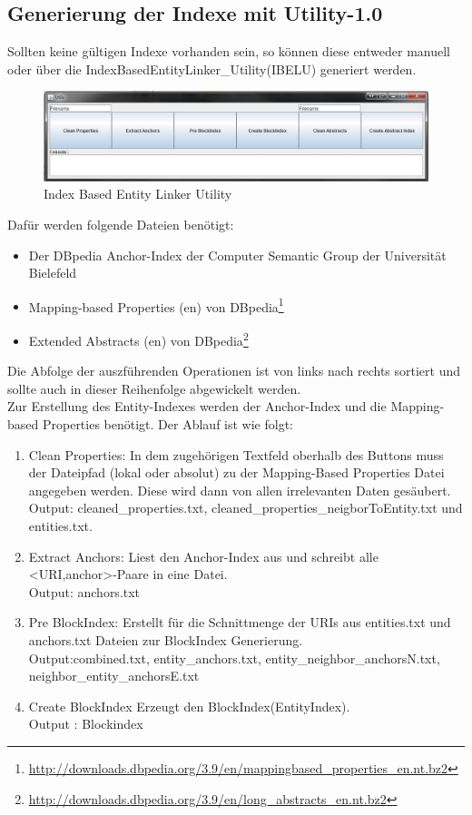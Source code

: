 \documentclass[11pt, a4paper, oneside]{Thesis} %
\begin{document}
\subsection{Generierung der Indexe mit Utility-1.0}
Sollten keine gültigen Indexe vorhanden sein, so k\"onnen diese entweder manuell oder \"uber die IndexBasedEntityLinker\_Utility(IBELU) generiert werden.
\begin{figure}[ht]
\centering
\includegraphics[scale=0.52]{util.jpg}
\caption[Index Based Entity Linker Utility]{Index Based Entity Linker Utility}
\end{figure}
\clearpage
Daf\"ur werden folgende Dateien ben\"otigt:
\begin{itemize}
\item Der DBpedia Anchor-Index der Computer Semantic Group der Universit\"at Bielefeld
\item Mapping-based Properties (en) von DBpedia\footnote{\url{http://downloads.dbpedia.org/3.9/en/mappingbased\_properties\_en.nt.bz2}}
\item Extended Abstracts (en) von DBpedia\footnote{\url{http://downloads.dbpedia.org/3.9/en/long\_abstracts\_en.nt.bz2}}
\end{itemize}
Die Abfolge der auszf\"uhrenden Operationen ist von links nach rechts sortiert und sollte auch in dieser Reihenfolge abgewickelt werden.\\
Zur Erstellung des Entity-Indexes werden der Anchor-Index und die Mapping-based Properties ben\"otigt. Der Ablauf ist wie folgt:
\begin{enumerate}
\item Clean Properties: In dem zugeh\"origen Textfeld oberhalb des Buttons muss der Dateipfad (lokal oder absolut) zu der Mapping-Based Properties Datei angegeben werden. Diese wird dann von allen irrelevanten Daten ges\"aubert.\\
Output: cleaned\_properties.txt, cleaned\_properties\_neigborToEntity.txt und \\entities.txt.
\item Extract Anchors: Liest den Anchor-Index aus und schreibt alle \\ \textless URI,anchor\textgreater-Paare in eine Datei.\\
Output: anchors.txt
\item Pre BlockIndex: Erstellt f\"ur die Schnittmenge der URIs aus entities.txt und anchors.txt Dateien zur BlockIndex Generierung.\\
Output:combined.txt, entity\_anchors.txt, entity\_neighbor\_anchorsN.txt,
\\neighbor\_entity\_anchorsE.txt
\item Create BlockIndex Erzeugt den BlockIndex(EntityIndex).\\
Output : Blockindex
\end{enumerate}
\end{document}
